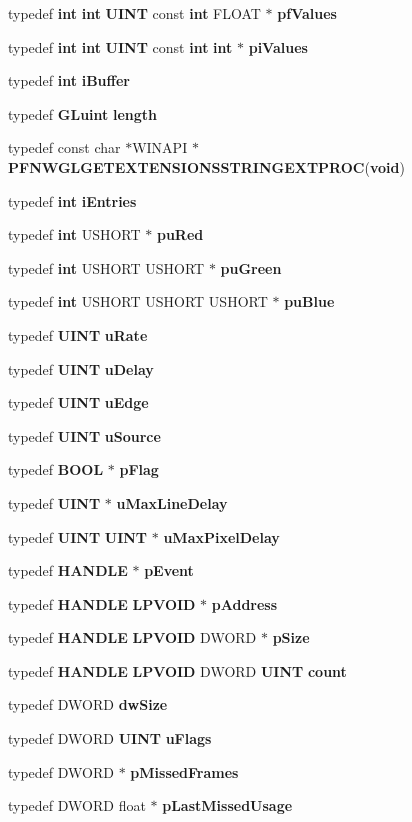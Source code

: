 \begin{DoxyCompactItemize}
\item 
typedef {\bf int} {\bf int} {\bf U\+I\+NT} const {\bf int} F\+L\+O\+AT $\ast$ {\bf pf\+Values}
\item 
typedef {\bf int} {\bf int} {\bf U\+I\+NT} const {\bf int} {\bf int} $\ast$ {\bf pi\+Values}
\item 
typedef {\bf int} {\bf i\+Buffer}
\item 
typedef {\bf G\+Luint} {\bf length}
\item 
typedef const char $\ast$W\+I\+N\+A\+PI $\ast$ {\bf P\+F\+N\+W\+G\+L\+G\+E\+T\+E\+X\+T\+E\+N\+S\+I\+O\+N\+S\+S\+T\+R\+I\+N\+G\+E\+X\+T\+P\+R\+OC}({\bf void})
\item 
typedef {\bf int} {\bf i\+Entries}
\item 
typedef {\bf int} U\+S\+H\+O\+RT $\ast$ {\bf pu\+Red}
\item 
typedef {\bf int} U\+S\+H\+O\+RT U\+S\+H\+O\+RT $\ast$ {\bf pu\+Green}
\item 
typedef {\bf int} U\+S\+H\+O\+RT U\+S\+H\+O\+RT U\+S\+H\+O\+RT $\ast$ {\bf pu\+Blue}
\item 
typedef {\bf U\+I\+NT} {\bf u\+Rate}
\item 
typedef {\bf U\+I\+NT} {\bf u\+Delay}
\item 
typedef {\bf U\+I\+NT} {\bf u\+Edge}
\item 
typedef {\bf U\+I\+NT} {\bf u\+Source}
\item 
typedef {\bf B\+O\+OL} $\ast$ {\bf p\+Flag}
\item 
typedef {\bf U\+I\+NT} $\ast$ {\bf u\+Max\+Line\+Delay}
\item 
typedef {\bf U\+I\+NT} {\bf U\+I\+NT} $\ast$ {\bf u\+Max\+Pixel\+Delay}
\item 
typedef {\bf H\+A\+N\+D\+LE} $\ast$ {\bf p\+Event}
\item 
typedef {\bf H\+A\+N\+D\+LE} {\bf L\+P\+V\+O\+ID} $\ast$ {\bf p\+Address}
\item 
typedef {\bf H\+A\+N\+D\+LE} {\bf L\+P\+V\+O\+ID} D\+W\+O\+RD $\ast$ {\bf p\+Size}
\item 
typedef {\bf H\+A\+N\+D\+LE} {\bf L\+P\+V\+O\+ID} D\+W\+O\+RD {\bf U\+I\+NT} {\bf count}
\item 
typedef D\+W\+O\+RD {\bf dw\+Size}
\item 
typedef D\+W\+O\+RD {\bf U\+I\+NT} {\bf u\+Flags}
\item 
typedef D\+W\+O\+RD $\ast$ {\bf p\+Missed\+Frames}
\item 
typedef D\+W\+O\+RD float $\ast$ {\bf p\+Last\+Missed\+Usage}

\end{DoxyCompactItemize}
